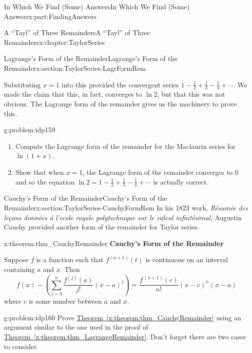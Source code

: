 \documentclass[oneside,10pt,]{book}
\newcommand{\xreffont}{\relax}
\newcommand{\terminology}[1]{\textbf{#1}}
\numberwithin{equation}{section}
\begin{document}
\begin{partptx}{In Which We Find (Some) Answers}{}{In Which We Find (Some) Answers}{}{}{x:part:FindingAnswers}
\begin{chapterptx}{A ``Tayl'' of Three Remainders}{}{A ``Tayl'' of Three Remainders}{}{}{x:chapter:TaylorSeries}
\begin{sectionptx}{Lagrange's Form of the Remainder}{}{Lagrange's Form of the Remainder}{}{}{x:section:TaylorSeries-LagrFormRem}
\begin{equation*}
\end{equation*}
%
\par
Substituting \(x=1\) into this provided the convergent series \(1-\frac{1}{2}+\frac{1}{3}-\frac{1}{4}+\cdots\). We made the claim that this, in fact, converges to \(\ln 2\), but that this was not obvious. The Lagrange form of the remainder gives us the machinery to prove this.%
\begin{problem}{}{g:problem:idp159}%
\begin{enumerate}[font=\bfseries,label=(\alph*),ref=\alph*]
\item{}Compute the Lagrange form of the remainder for the Maclaurin series for \(\ln\left(1+x\right)\).%
\item{}Show that when \(x=1\), the Lagrange form of the remainder converges to \(0\) and so the equation \(\ln 2=1-\frac{1}{2}+\frac{1}{3}-\frac{1}{4}+\cdots\) is actually correct.%
\end{enumerate}
\end{problem}
\end{sectionptx}
%
%
\typeout{************************************************}
\typeout{************************************************}
%
\begin{sectionptx}{Cauchy's Form of the Remainder}{}{Cauchy's Form of the Remainder}{}{}{x:section:TaylorSeries-CauchyFormRem}
In his 1823 work, \textit{Résumée des leçons données á l'ecole royale polytechnique sur le calcul infintésimal,} Augustin Cauchy  provided another form of the remainder for Taylor series.%
\begin{theorem}{}{}{x:theorem:thm_CauchyRemainder}%
\terminology{Cauchy's Form of the Remainder}%
\par
{} Suppose \(f\) is a function such that \(f^{(n+1)}(t)\) is continuous on an interval containing \(a\) and \(x\). Then%
\begin{equation*}
f(x)-\left(\sum_{j=0}^n\frac{f^{(j)}(a)}{j!}(x-a)^j\right)=\frac{f^{\, (n+1)}(c)}{n!}(x-c)^n(x-a)
\end{equation*}
where \(c\) is some number between \(a\) and \(x\).%
\end{theorem}
\begin{problem}{}{g:problem:idp160}%
 Prove \hyperref[x:theorem:thm_CauchyRemainder]{Theorem~{\xreffont\ref{x:theorem:thm_CauchyRemainder}}} using an argument similar to the one used in the proof of \hyperref[x:theorem:thm_LagrangeRemainder]{Theorem~{\xreffont\ref{x:theorem:thm_LagrangeRemainder}}}. Don't forget there are two cases to consider.%

\end{problem}
\end{sectionptx}
\end{chapterptx}
\end{partptx}
\end{document}
